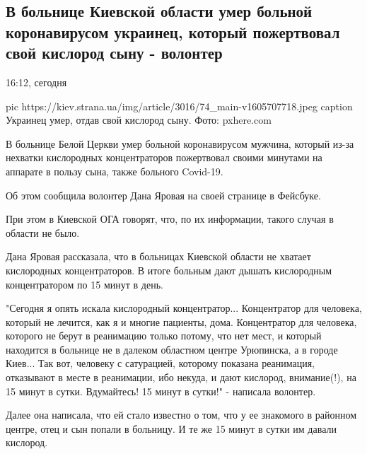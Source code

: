  
 
 

\subsection{В больнице Киевской области умер больной коронавирусом украинец, который пожертвовал свой кислород сыну - волонтер}

16:12, сегодня

\ifcmt
pic https://kiev.strana.ua/img/article/3016/74_main-v1605707718.jpeg
caption Украинец умер, отдав свой кислород сыну. Фото: pxhere.com 
\fi

В больнице Белой Церкви умер больной коронавирусом мужчина, который из-за
нехватки кислородных концентраторов пожертвовал своими минутами на
аппарате в пользу сына, также больного Covid-19.

Об этом сообщила волонтер Дана Яровая на своей странице в Фейсбуке.

При этом в Киевской ОГА говорят, что, по их информации, такого случая в
области не было.

Дана Яровая рассказала, что в больницах Киевской области не хватает
кислородных концентраторов. В итоге больным дают дышать кислородным
концентратором по 15 минут в день.

"Сегодня я опять искала кислородный концентратор... Концентратор для
человека, который не лечится, как я и многие пациенты, дома. Концентратор
для человека, которого не берут в реанимацию только потому, что нет мест,
и который находится в больнице не в далеком областном центре Урюпинска, а
в городе Киев... Так вот, человеку с сатурацией, которому показана
реанимация, отказывают в месте в реанимации, ибо некуда, и дают кислород,
внимание(!), на 15 минут в сутки. Вдумайтесь! 15 минут в сутки!" -
написала волонтер.

Далее она написала, что ей стало известно о том, что у ее знакомого в
районном центре, отец и сын попали в больницу. И те же 15 минут в сутки им
давали кислород.

